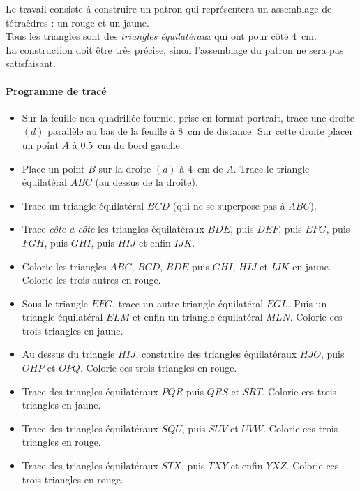 Le travail consiste à construire un patron qui représentera un assemblage de
tétraèdres : un rouge et un jaune.
\\Tous les triangles sont des {\em triangles équilatéraux} qui ont
pour côté 4~cm.
\\La construction doit être très précise, sinon l'assemblage du patron
ne sera pas satisfaisant.
\paragraph{Programme de tracé}\hfill\newline
\begin{itemize}
\item Sur la feuille non quadrillée fournie, prise en format portrait,
  trace une droite $(d)$ parallèle au bas de la feuille à 8~cm de
  distance. Sur cette droite placer un point $A$ à 0,5~cm du bord
  gauche.
\item Place un point $B$ sur la droite $(d)$ à 4~cm de $A$. Trace le
  triangle équilatéral $ABC$ (au dessus de la droite).
\item Trace un triangle équilatéral $BCD$ (qui ne se superpose pas à
  $ABC$).
\item Trace {\em côte à côte} les triangles équilatéraux $BDE$, puis
  $DEF$, puis $EFG$, puis $FGH$, puis $GHI$, puis $HIJ$ et enfin
  $IJK$.
\item Colorie les triangles $ABC$, $BCD$, $BDE$ puis $GHI$, $HIJ$ et
  $IJK$ en jaune. Colorie les trois autres en rouge.
\item Sous le triangle $EFG$, trace un autre triangle équilatéral
  $EGL$. Puis un triangle équilatéral $ELM$ et enfin un triangle
  équilatéral $MLN$. Colorie ces trois triangles en jaune.
\item Au dessus du triangle $HIJ$, construire des triangles
  équilatéraux $HJO$, puis $OHP$ et $OPQ$. Colorie ces trois triangles
  en rouge.
\item Trace des triangles équilatéraux $PQR$ puis $QRS$ et
  $SRT$. Colorie ces trois triangles en jaune.
\item Trace des triangles équilatéraux $SQU$, puis $SUV$ et
  $UVW$. Colorie ces trois triangles en rouge.
\item Trace des triangles équilatéraux $STX$, puis $TXY$ et enfin
  $YXZ$. Colorie ces trois triangles en rouge.
\end{itemize}
